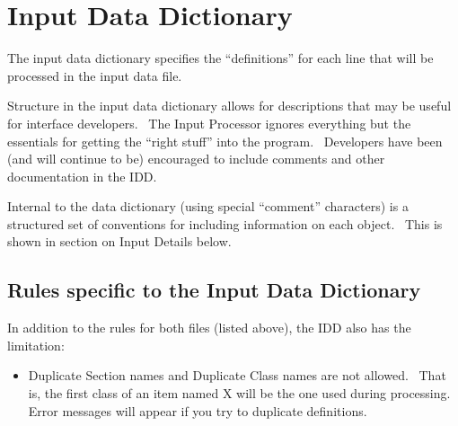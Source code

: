\section{Input Data Dictionary}\label{input-data-dictionary}

The input data dictionary specifies the ``definitions'' for each line that will be processed in the input data file.

Structure in the input data dictionary allows for descriptions that may be useful for interface developers.~ The Input Processor ignores everything but the essentials for getting the ``right stuff'' into the program.~ Developers have been (and will continue to be) encouraged to include comments and other documentation in the IDD.

Internal to the data dictionary (using special ``comment'' characters) is a structured set of conventions for including information on each object.~ This is shown in section on Input Details below.

\subsection{Rules specific to the Input Data Dictionary}\label{rules-specific-to-the-input-data-dictionary}

In addition to the rules for both files (listed above), the IDD also has the limitation:

\begin{itemize}
\tightlist
\item
  Duplicate Section names and Duplicate Class names are not allowed.~ That is, the first class of an item named X will be the one used during processing.~ Error messages will appear if you try to duplicate definitions.
\end{itemize}

